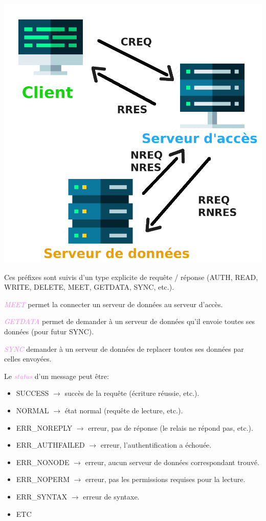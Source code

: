 \documentclass[a4paper]{article}
\newcommand{\ra}{\rightarrow}
\let\oldtextit\textit
\renewcommand{\textit}[1]{\textcolor{violet}{\oldtextit{#1}}}
\begin{document}
\begin{center}
    \includegraphics[scale=0.2]{img/req.png}
\end{center}

Ces préfixes sont suivis d'un type explicite de requête / réponse (AUTH, READ, WRITE, DELETE, MEET, GETDATA, SYNC, etc.).

\textit{MEET} permet la connecter un serveur de données au serveur d'accès.

\textit{GETDATA} permet de demander à un serveur de données qu'il envoie toutes ses données (pour futur SYNC).

\textit{SYNC} demander à un serveur de données de replacer toutes ses données par celles envoyées.

Le \textit{status} d'un message peut être:
\begin{itemize}
    \item SUCCESS $\ra$ succès de la requête (écriture réussie, etc.).
    \item NORMAL $\ra$ état normal (requête de lecture, etc.).
    \item ERR\_NOREPLY $\ra$ erreur, pas de réponse (le relais ne répond pas, etc.).
    \item ERR\_AUTHFAILED $\ra$ erreur, l'authentification a échouée.
    \item ERR\_NONODE $\ra$ erreur, aucun serveur de données correspondant trouvé.
    \item ERR\_NOPERM $\ra$ erreur, pas les permissions requises pour la lecture.
    \item ERR\_SYNTAX $\ra$ erreur de syntaxe.
    \item ETC
\end{itemize}
\end{document}

